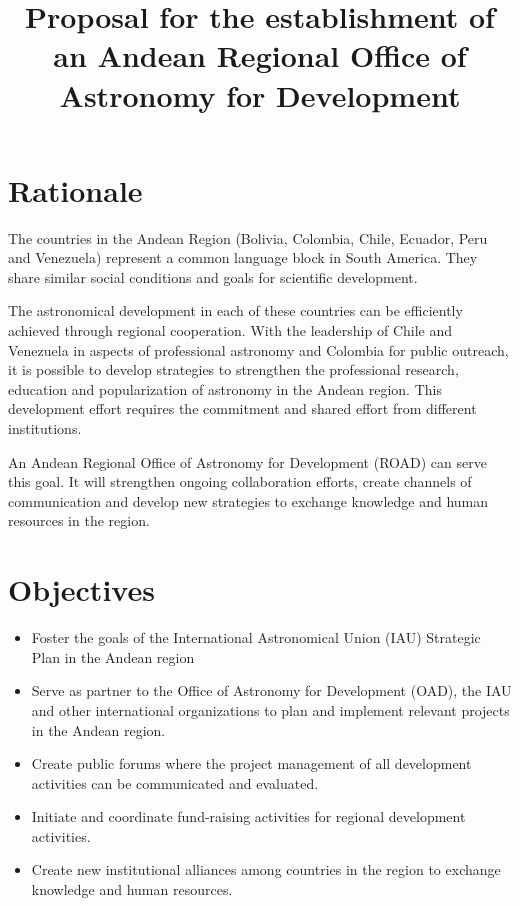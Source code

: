 \documentclass[12pt]{article}
\title{Proposal for the establishment of an Andean Regional Office of
  Astronomy for Development}
\begin{document}
\maketitle
\tableofcontents
\section{Rationale}

The countries in the Andean Region (Bolivia, Colombia, Chile, Ecuador,
Peru and Venezuela) represent a common language block in South
America. They share similar social conditions and goals for scientific
development.  

The astronomical development in each of these countries can be
efficiently achieved through regional cooperation. With the leadership
of Chile and Venezuela in aspects of professional astronomy and
Colombia for public outreach, it is possible to develop strategies to
strengthen the professional research, education and popularization of
astronomy in the Andean region. This development effort requires the
commitment and shared effort from different institutions. 

An Andean Regional Office of Astronomy for Development (ROAD) can
serve this goal.  It will strengthen ongoing collaboration efforts,
create channels of communication and develop new strategies to
exchange knowledge and human resources in the region.  

\section{Objectives}
\begin{itemize}
\item
Foster the goals of the International Astronomical Union (IAU) Strategic Plan in the Andean region
\item
Serve as partner to the Office of Astronomy for Development (OAD), the IAU and other international
organizations to plan and implement relevant projects in the Andean
region. 
\item
Create public forums where the project management of all development
activities can be communicated and evaluated. 
\item
Initiate and coordinate fund-raising activities for regional
development activities. 
\item
Create new institutional alliances among countries in the region to
exchange knowledge and human resources. 
\end{itemize}
\end{document}
